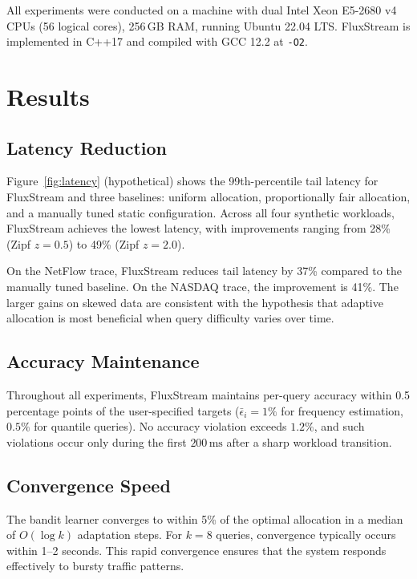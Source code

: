 \documentclass[
    language=english,
    doctype=dissertation,
    institution=none,
    titlestyle=book,
]{../../omnilatex}
\begin{document}
All experiments were conducted on a machine with dual Intel Xeon E5-2680 v4 CPUs (56 logical cores), 256\,GB RAM, running Ubuntu 22.04 LTS. FluxStream is implemented in C++17 and compiled with GCC 12.2 at \texttt{-O2}.

\chapter{Results}\label{ch:results}

\section{Latency Reduction}

Figure~\ref{fig:latency} (hypothetical) shows the 99th-percentile tail latency for FluxStream and three baselines: uniform allocation, proportionally fair allocation, and a manually tuned static configuration. Across all four synthetic workloads, FluxStream achieves the lowest latency, with improvements ranging from 28\% (Zipf $z = 0.5$) to 49\% (Zipf $z = 2.0$).

On the NetFlow trace, FluxStream reduces tail latency by 37\% compared to the manually tuned baseline. On the NASDAQ trace, the improvement is 41\%. The larger gains on skewed data are consistent with the hypothesis that adaptive allocation is most beneficial when query difficulty varies over time.

\section{Accuracy Maintenance}

Throughout all experiments, FluxStream maintains per-query accuracy within 0.5 percentage points of the user-specified targets ($\bar{\epsilon}_i = 1\%$ for frequency estimation, $0.5\%$ for quantile queries). No accuracy violation exceeds $1.2\%$, and such violations occur only during the first $200\,\text{ms}$ after a sharp workload transition.

\section{Convergence Speed}

The bandit learner converges to within 5\% of the optimal allocation in a median of $O(\log k)$ adaptation steps. For $k = 8$ queries, convergence typically occurs within 1--2 seconds. This rapid convergence ensures that the system responds effectively to bursty traffic patterns.
\end{document}

